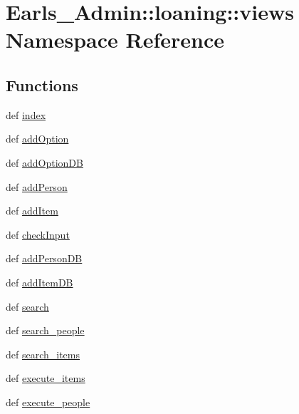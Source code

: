 \hypertarget{namespaceEarls__Admin_1_1loaning_1_1views}{
\section{Earls\_\-Admin::loaning::views Namespace Reference}
\label{namespaceEarls__Admin_1_1loaning_1_1views}
}


\subsection*{Functions}
\begin{CompactItemize}
\item 
def \hyperlink{namespaceEarls__Admin_1_1loaning_1_1views_a64c7a946718a1d28dd4ec76602b1cf0}{index}
\item 
def \hyperlink{namespaceEarls__Admin_1_1loaning_1_1views_47906fb9f252ab205561f960435c6d26}{addOption}
\item 
def \hyperlink{namespaceEarls__Admin_1_1loaning_1_1views_2ae65fbcff8f695fb2caf848b85e511c}{addOptionDB}
\item 
def \hyperlink{namespaceEarls__Admin_1_1loaning_1_1views_71b7b9ffceb8b7be82716afe75debc5a}{addPerson}
\item 
def \hyperlink{namespaceEarls__Admin_1_1loaning_1_1views_3279813171484182fab73cb8480aa310}{addItem}
\item 
def \hyperlink{namespaceEarls__Admin_1_1loaning_1_1views_6d28375779b939b3cafff337017fdff9}{checkInput}
\item 
def \hyperlink{namespaceEarls__Admin_1_1loaning_1_1views_8fdf122909e21d4381c1bab824dfb980}{addPersonDB}
\item 
def \hyperlink{namespaceEarls__Admin_1_1loaning_1_1views_a770def5281ee18891797b16dfd815f6}{addItemDB}
\item 
def \hyperlink{namespaceEarls__Admin_1_1loaning_1_1views_3446daee6cabaea8299b2d2d53c15d4f}{search}
\item 
def \hyperlink{namespaceEarls__Admin_1_1loaning_1_1views_02fd21901fc8f89eb476084adef8e337}{search\_\-people}
\item 
def \hyperlink{namespaceEarls__Admin_1_1loaning_1_1views_09922582780aec8f77bdc2842eef676b}{search\_\-items}
\item 
def \hyperlink{namespaceEarls__Admin_1_1loaning_1_1views_cb2865c2206914bb39cd0c831a83c811}{execute\_\-items}
\item 
def \hyperlink{namespaceEarls__Admin_1_1loaning_1_1views_0892caccb7ff366c7a4ca2b0955fc848}{execute\_\-people}

\end{CompactItemize}
